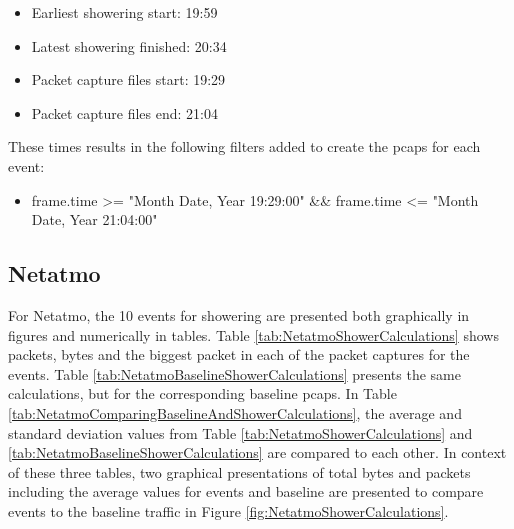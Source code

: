 \begin{itemize}
    \item Earliest showering start: 19:59
    \item Latest showering finished: 20:34
    \item Packet capture files start: 19:29
    \item Packet capture files end: 21:04
\end{itemize}

These times results in the following filters added to create the pcaps for each event:
\begin{itemize}
    \item frame.time >= "Month Date, Year 19:29:00" \&\& frame.time <= "Month Date, Year 21:04:00"
\end{itemize}

\newpage
\subsection{Netatmo}
For Netatmo, the 10 events for showering are presented both graphically in figures and numerically in tables. Table \ref{tab:NetatmoShowerCalculations} shows packets, bytes and the biggest packet in each of the packet captures for the events. Table \ref{tab:NetatmoBaselineShowerCalculations} presents the same calculations, but for the corresponding baseline pcaps. In Table \ref{tab:NetatmoComparingBaselineAndShowerCalculations}, the average and standard deviation values from Table \ref{tab:NetatmoShowerCalculations} and \ref{tab:NetatmoBaselineShowerCalculations} are compared to each other. In context of these three tables, two graphical presentations of total bytes and packets including the average values for events and baseline are presented to compare events to the baseline traffic in Figure \ref{fig:NetatmoShowerCalculations}. 

